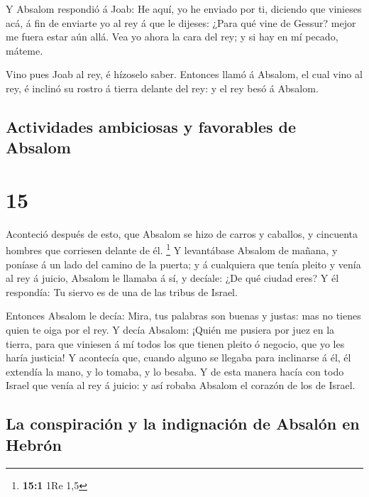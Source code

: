  Y Absalom respondió á Joab: He aquí, yo he enviado por
ti, diciendo que vinieses acá, á fin de enviarte yo al rey á que le
dijeses: ¿Para qué vine de Gessur? mejor me fuera estar aún allá. Vea yo
ahora la cara del rey; y si hay en mí pecado, máteme.

 Vino pues Joab al rey, é hízoselo saber. Entonces llamó
á Absalom, el cual vino al rey, é inclinó su rostro á tierra delante del
rey: y el rey besó á Absalom.

\hypertarget{actividades-ambiciosas-y-favorables-de-absalom}{%
\subsection{Actividades ambiciosas y favorables de
Absalom}\label{actividades-ambiciosas-y-favorables-de-absalom}}

\hypertarget{section-14}{%
\section{15}\label{section-14}}

 Aconteció después de esto, que Absalom se hizo de carros
y caballos, y cincuenta hombres que corriesen delante de él. \footnote{\textbf{15:1}
  1Re 1,5}  Y levantábase Absalom de mañana, y poníase á
un lado del camino de la puerta; y á cualquiera que tenía pleito y venía
al rey á juicio, Absalom le llamaba á sí, y decíale: ¿De qué ciudad
eres? Y él respondía: Tu siervo es de una de las tribus de Israel.

 Entonces Absalom le decía: Mira, tus palabras son buenas
y justas: mas no tienes quien te oiga por el rey.  Y decía
Absalom: ¡Quién me pusiera por juez en la tierra, para que viniesen á mí
todos los que tienen pleito ó negocio, que yo les haría justicia!
 Y acontecía que, cuando alguno se llegaba para inclinarse
á él, él extendía la mano, y lo tomaba, y lo besaba.  Y de
esta manera hacía con todo Israel que venía al rey á juicio: y así
robaba Absalom el corazón de los de Israel.

\hypertarget{la-conspiraciuxf3n-y-la-indignaciuxf3n-de-absaluxf3n-en-hebruxf3n}{%
\subsection{La conspiración y la indignación de Absalón en
Hebrón}\label{la-conspiraciuxf3n-y-la-indignaciuxf3n-de-absaluxf3n-en-hebruxf3n}}

